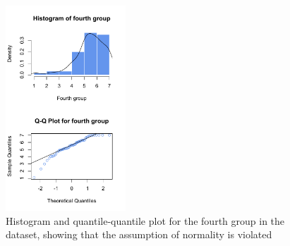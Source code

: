 \begin{figure}[h!]
\centering
\includegraphics[width=0.4\textwidth]{histPL}
\caption{Histogram and quantile-quantile plot for the fourth group in the  dataset, showing that the assumption of normality is violated}
\label{fig:histPL}
\end{figure}

